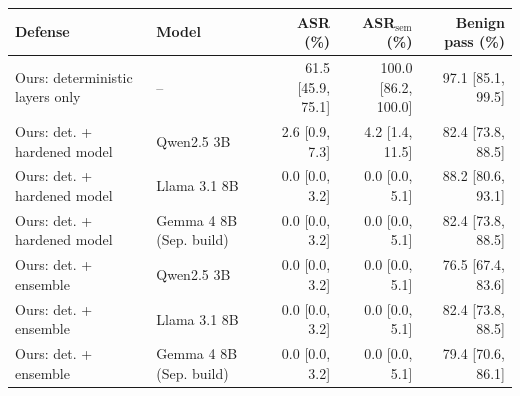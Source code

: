 \begin{tabular}{@{}llrrr@{}}
\toprule
Defense & Model & ASR (\%) & ASR$_{\mathrm{sem}}$ (\%) & Benign pass (\%) \\
\midrule
Ours: deterministic layers only & -- & 61.5 {\scriptsize[45.9, 75.1]} & 100.0 {\scriptsize[86.2, 100.0]} & 97.1 {\scriptsize[85.1, 99.5]} \\
Ours: det. + hardened model & Qwen2.5 3B & 2.6 {\scriptsize[0.9, 7.3]} & 4.2 {\scriptsize[1.4, 11.5]} & 82.4 {\scriptsize[73.8, 88.5]} \\
Ours: det. + hardened model & Llama 3.1 8B & 0.0 {\scriptsize[0.0, 3.2]} & 0.0 {\scriptsize[0.0, 5.1]} & 88.2 {\scriptsize[80.6, 93.1]} \\
Ours: det. + hardened model & Gemma 4 8B (Sep. build) & 0.0 {\scriptsize[0.0, 3.2]} & 0.0 {\scriptsize[0.0, 5.1]} & 82.4 {\scriptsize[73.8, 88.5]} \\
Ours: det. + ensemble & Qwen2.5 3B & 0.0 {\scriptsize[0.0, 3.2]} & 0.0 {\scriptsize[0.0, 5.1]} & 76.5 {\scriptsize[67.4, 83.6]} \\
Ours: det. + ensemble & Llama 3.1 8B & 0.0 {\scriptsize[0.0, 3.2]} & 0.0 {\scriptsize[0.0, 5.1]} & 82.4 {\scriptsize[73.8, 88.5]} \\
Ours: det. + ensemble & Gemma 4 8B (Sep. build) & 0.0 {\scriptsize[0.0, 3.2]} & 0.0 {\scriptsize[0.0, 5.1]} & 79.4 {\scriptsize[70.6, 86.1]} \\
\bottomrule
\end{tabular}
